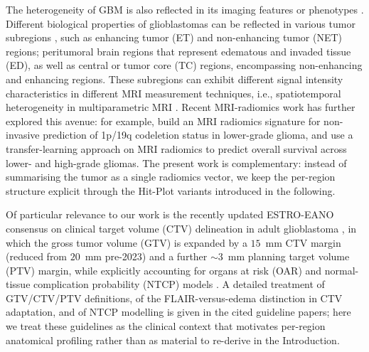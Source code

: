 \documentclass[a4paper,11pt,leqno]{article}
\begin{document}
The heterogeneity of GBM is also reflected in its imaging features or phenotypes \cite{Aerts2014,Itakura2015,Rathore2016}.
Different biological properties of glioblastomas can be reflected in various tumor subregions \cite{FathiKazerooni2020}, %
such as enhancing tumor (ET) and non-enhancing tumor (NET) regions; peritumoral brain regions that represent edematous and invaded tissue (ED), as well as central or tumor core (TC) regions, encompassing non-enhancing and enhancing regions. These subregions can exhibit different signal intensity characteristics in different MRI measurement techniques, i.e., spatiotemporal heterogeneity in multiparametric MRI \cite{Park2021}. %
Recent MRI-radiomics work has further explored this avenue: for example, \cite{PMID34771562} build an MRI radiomics signature for non-invasive prediction of 1p/19q codeletion status in lower-grade glioma, and \cite{PMID37432527} use a transfer-learning approach on MRI radiomics to predict overall survival across lower- and high-grade gliomas. The present work is complementary: instead of summarising the tumor as a single radiomics vector, we keep the per-region structure explicit through the Hit-Plot variants introduced in the following.

Of particular relevance to our work is the recently updated
ESTRO-EANO consensus on clinical target volume (CTV) delineation in adult
glioblastoma \cite{Niyazi2023,Hannisdal2023b}, in which the gross tumor
volume (GTV) is expanded by a $15$~mm CTV margin (reduced from $20$~mm
pre-2023) and a further $\sim 3$~mm planning target volume (PTV) margin,
while explicitly accounting for organs at risk (OAR) \cite{Mir2020} and
normal-tissue complication probability (NTCP) models \cite{Palma2019}. A
detailed treatment of GTV/CTV/PTV definitions, of the FLAIR-versus-edema
distinction in CTV adaptation, and of NTCP modelling is given in the
cited guideline papers; here we treat these guidelines as the clinical
context that motivates per-region anatomical profiling rather than as
material to re-derive in the Introduction.
\end{document}
